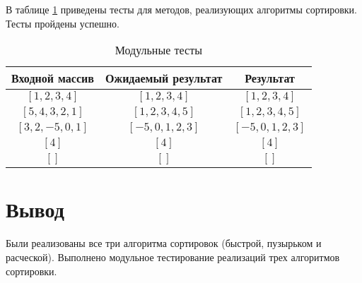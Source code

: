 В таблице \ref{tbl:functional_test} приведены тесты для методов, реализующих алгоритмы сортировки. Тесты пройдены успешно.

\captionsetup{justification=raggedright, singlelinecheck=false}

\begin{table}[H]
		\caption{\label{tbl:functional_test} Модульные тесты}
	\begin{center}
			\begin{tabular}{|c|c|c|}
			\hline
			Входной массив & Ожидаемый результат & Результат \\ 
			\hline
			$[1,2,3,4]$ & $[1,2,3,4]$  & $[1,2,3,4]$\\
			$[5,4,3,2,1]$  & $[1,2,3,4,5]$ & $[1,2,3,4,5]$\\
			$[3,2,-5,0,1]$  & $[-5,0,1,2,3]$  & $[-5,0,1,2,3]$\\
			$[4]$  & $[4]$  & $[4]$\\
			$[]$  & $[]$  & $[]$\\
			\hline
		\end{tabular}
	\end{center}
\end{table}


\section*{Вывод}

Были реализованы все три алгоритма сортировок (быстрой, пузырьком и расческой). Выполнено модульное тестирование реализаций трех алгоритмов сортировки.
